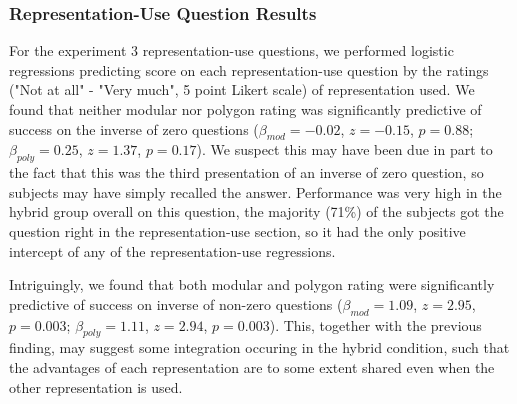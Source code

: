 \documentclass[man,10pt]{apa6}
\begin{document}
\subsubsection{Representation-Use Question Results}
For the experiment 3 representation-use questions, we performed logistic regressions predicting score on each representation-use question by the ratings ("Not at all" - "Very much", 5 point Likert scale) of representation used. We found that neither modular nor polygon rating was significantly predictive of success on the inverse of zero questions ($\beta_{mod} = -0.02$, $z = -0.15$, $p = 0.88$; $\beta_{poly} = 0.25$, $z = 1.37$, $p = 0.17$). We suspect this may have been due in part to the fact that this was the third presentation of an inverse of zero question, so subjects may have simply recalled the answer. Performance was very high in the hybrid group overall on this question, the majority (71\%) of the subjects got the question right in the representation-use section, so it had the only positive intercept of any of the representation-use regressions.\par 
Intriguingly, we found that both modular and polygon rating were significantly predictive of success on inverse of non-zero questions ($\beta_{mod} = 1.09$, $z = 2.95$, $p = 0.003$; $\beta_{poly} = 1.11$, $z = 2.94$, $p = 0.003$). This, together with the previous finding, may suggest some integration occuring in the hybrid condition, such that the advantages of each representation are to some extent shared even when the other representation is used. 
\end{document}
